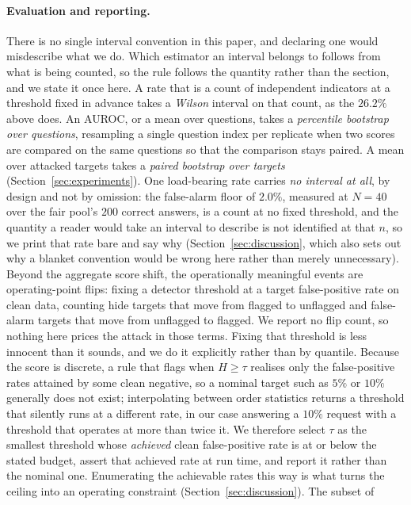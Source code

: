 \paragraph{Evaluation and reporting.}
There is no single interval convention in this paper, and declaring one would misdescribe
what we do. Which estimator an interval belongs to follows from what is being counted, so
the rule follows the quantity rather than the section, and we state it once here. A rate that is a count of independent
indicators at a threshold fixed in advance takes a \emph{Wilson} interval on that count,
as the $26.2\%$ above does. An AUROC, or a mean over questions, takes a \emph{percentile
bootstrap over questions}, resampling a single question index per replicate when two
scores are compared on the same questions so that the comparison stays paired. A mean over
attacked targets takes a \emph{paired bootstrap over targets}
(Section~\ref{sec:experiments}). One load-bearing rate carries \emph{no interval at all},
by design and not by omission: the false-alarm floor of $2.0\%$, measured at $N{=}40$ over
the fair pool's $200$ correct answers, is a count at no
fixed threshold, and the quantity a reader would take an interval to describe is not
identified at that $n$, so we print that rate bare and say why
(Section~\ref{sec:discussion}, which also sets out why a blanket convention would be wrong
here rather than merely unnecessary).
Beyond the aggregate score shift, the operationally meaningful events are operating-point
flips: fixing a detector threshold at a target false-positive rate on clean data, counting hide
targets that move from flagged to unflagged and false-alarm targets that move
from unflagged to flagged. We report no flip count, so nothing here prices the attack in those
terms. Fixing that
threshold is less innocent than it sounds, and we do it explicitly rather than by quantile.
Because the score is discrete, a rule that flags when $H \geq \tau$ realises only the
false-positive rates attained by some clean negative, so a nominal target such as
$5\%$ or $10\%$ generally
does not exist; interpolating between order statistics returns a threshold that silently runs
at a different rate, in our case answering a $10\%$ request with a threshold that operates at
more than twice it. We therefore select $\tau$ as the smallest threshold whose \emph{achieved} clean
false-positive rate is at or below the stated budget, assert that achieved rate at run time,
and report it rather than the nominal one. Enumerating the achievable rates this way is what
turns the ceiling into an operating constraint (Section~\ref{sec:discussion}). The subset of
